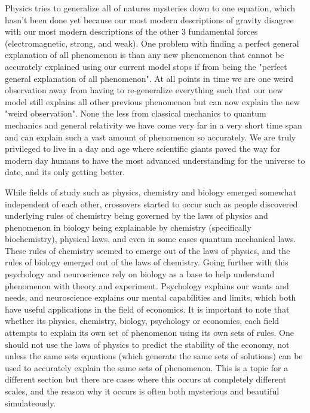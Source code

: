\documentclass{article}
\begin{document}
Physics tries to generalize all of natures mysteries down to one equation, which hasn't been done yet because our most modern descriptions of gravity disagree with our most modern descriptions of the other 3 fundamental forces (electromagnetic, strong, and weak). One problem with finding a perfect general explanation of all phenomenon is than any new phenomenon that cannot be accurately explained using our current model stops if from being the "perfect general explanation of all phenomenon". At all points in time we are one weird observation away from having to re-generalize everything such that our new model still explains all other previous phenomenon but can now explain the new "weird observation". None the less from classical mechanics to quantum mechanics and general relativity we have come very far in a very short time span and can explain such a vast amount of phenomenon so accurately. We are truly privileged to live in a day and age where scientific giants paved the way for modern day humans to have the most advanced understanding for the universe to date, and its only getting better. 

While fields of study such as physics, chemistry and biology emerged somewhat independent of each other, crossovers started to occur such as people discovered underlying rules of chemistry being governed by the laws of physics and phenomenon in biology being explainable by chemistry (specifically biochemistry), physical laws, and even in some cases quantum mechanical laws. These rules of chemistry seemed to emerge out of the laws of physics, and the rules of biology emerged out of the laws of chemistry. Going further with this psychology and neuroscience rely on biology as a base to help understand phenomenon with theory and experiment. Psychology explains our wants and needs, and neuroscience explains our mental capabilities and limits, which both have useful applications in the field of economics. It is important to note that whether its physics, chemistry, biology, psychology or economics, each field attempts to explain its own set of phenomenon using its own sets of rules. One should not use the laws of physics to predict the stability of the economy, not unless the same sets equations (which generate the same sets of solutions) can be used to accurately explain the same sets of phenomenon. This is a topic for a different section but there are cases where this occurs at completely different scales, and the reason why it occurs is often both mysterious and beautiful simulateously. 
\end{document}
